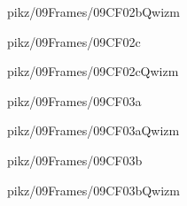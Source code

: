 \documentclass[9pt,xcolor={svgnames, x11names}]{beamer}
\begin{document}

\begin{frame}{pikz/09Frames/09CF02bQwizm}
  
\end{frame}


\begin{frame}{pikz/09Frames/09CF02c}
  
\end{frame}


\begin{frame}{pikz/09Frames/09CF02cQwizm}
  
\end{frame}


\begin{frame}{pikz/09Frames/09CF03a}
  
\end{frame}


\begin{frame}{pikz/09Frames/09CF03aQwizm}
  
\end{frame}


\begin{frame}{pikz/09Frames/09CF03b}
  
\end{frame}


\begin{frame}{pikz/09Frames/09CF03bQwizm}
  
\end{frame}

\end{document}

